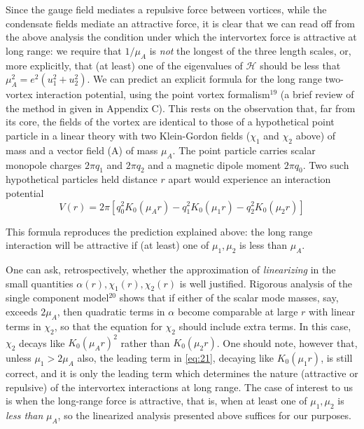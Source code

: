 Since the gauge field mediates a repulsive force between vortices, while the 
condensate fields mediate an attractive force, it is clear that we can read 
off from the above analysis the condition under which the intervortex force is 
attractive at long range: we require that \( 1/\mu_A \) is \emph{not} the 
longest of the three length scales, or, more explicitly, that (at least) one 
of the eigenvalues of \( \mathcal{H} \) should be less that 
\( \mu_A^2 = e^2(u_1^2 + u_2^2) \).  We can predict an explicit formula for 
the long range two-vortex interaction potential, using the point vortex 
formalism\( ^{19} \) (a brief review of the method in given in Appendix C). 
This rests on the observation that, far from its core, the fields of the 
vortex are identical to those of a hypothetical point particle in a linear 
theory with two Klein-Gordon fields (\( \chi_1 \) and \( \chi_2 \) above) of 
mass and a vector field (A) of mass \( \mu_A \). The point particle carries 
scalar monopole charges \( 2\pi q_1 \) and \( 2\pi q_2 \) and a magnetic 
dipole moment \( 2\pi q_0 \). Two such hypothetical particles held distance 
\( r \) apart would experience an interaction potential
\begin{equation}
    V(r) = 2\pi\left[ q_0^2 K_0(\mu_A r) - q_1^2 K_0(\mu_1 r) - 
        q_2^2 K_0(\mu_2 r) \right]
    \label{eq:22}
\end{equation}

This formula reproduces the prediction explained above: the long range 
interaction will be attractive if (at least) one of \( \mu_1, \mu_2 \) is less 
than \( \mu_A \). 

One can ask, retrospectively, whether the approximation of \emph{linearizing} 
in the small quantities \( \alpha(r), \chi_1(r), \chi_2(r) \) is well 
justified. Rigorous analysis of the single component model\( ^{20} \) shows 
that if either of the scalar mode masses, say, exceeds \( 2\mu_A \), then 
quadratic terms in \( \alpha \) become comparable at large \( r \) with linear 
terms in \( \chi_2 \), so that the equation for \( \chi_2 \) should include 
extra terms. In this case, \( \chi_2 \) decays like \( K_0(\mu_A r)^2 \) 
rather than \( K_0(\mu_2 r) \). One should note, however that, unless
\( \mu_1 > 2\mu_A \) also, the leading term in \eqref{eq:21}, decaying like 
\( K_0(\mu_1 r) \), is still correct, and it is only the leading term which 
determines the nature (attractive or repulsive) of the intervortex 
interactions at long range. The case of interest to us is when the long-range 
force is attractive, that is, when at least one of \( \mu_1, \mu_2 \) is 
\emph{less than} \( \mu_A \), so the linearized analysis presented above 
suffices for our purposes.


